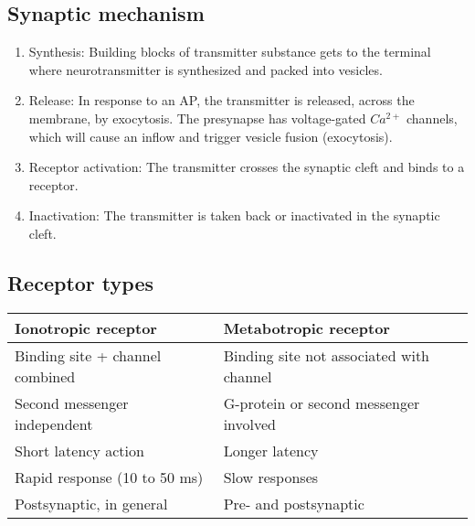 \documentclass[main]{subfiles}
\begin{document}
\subsection{Synaptic mechanism}
\begin{enumerate}
	\item Synthesis: Building blocks of transmitter substance gets to the terminal where neurotransmitter is synthesized and packed into vesicles.
	\item Release: In response to an AP, the transmitter is released, across the membrane, by exocytosis. The presynapse has voltage-gated $Ca^{2+}$ channels, which will cause an inflow and trigger vesicle fusion (exocytosis).
	\item Receptor activation: The transmitter crosses the synaptic cleft and binds to a receptor.
	\item Inactivation: The transmitter is taken back or inactivated in the synaptic cleft.
\end{enumerate}

\subsection{Receptor types}
\begin{tabular}{|l|l|}
	\hline
	\textbf{Ionotropic receptor} & \textbf{Metabotropic receptor}\\\hline
	Binding site + channel combined & Binding site not associated with channel\\\hline
	Second messenger independent & G-protein or second messenger involved\\\hline
	Short latency action & Longer latency\\\hline
	Rapid response (10 to 50 ms) & Slow responses\\\hline
	Postsynaptic, in general & Pre- and postsynaptic\\\hline
\end{tabular}
\end{document}
